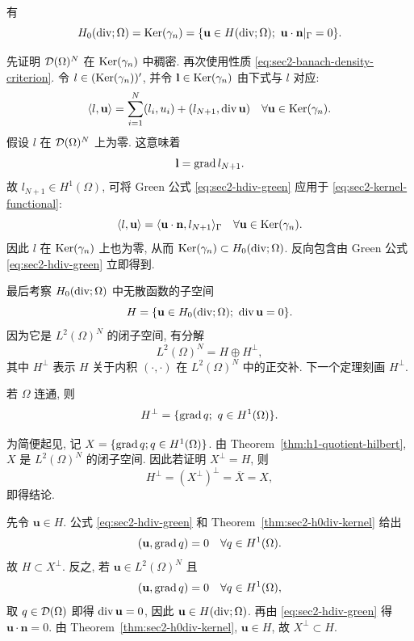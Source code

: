 \setcounter{statement}{5}
\begin{Theorem}\label{thm:sec2-h0div-kernel}
有
\[
  H_0(\operatorname{div};\Omega)=\operatorname{Ker}(\gamma_n)
  =\{\mathbf u\in H(\operatorname{div};\Omega);\ \mathbf u\cdot\mathbf n|_\Gamma=0\}.
\]
\end{Theorem}
\begin{Proof}
先证明 $\mathcal{D}(\Omega)^N$ 在 $\operatorname{Ker}(\gamma_n)$ 中稠密. 再次使用性质
\eqref{eq:sec2-banach-density-criterion}. 令 $l\in(\operatorname{Ker}(\gamma_n))'$, 并令
$\mathbf l\in\operatorname{Ker}(\gamma_n)$ 由下式与 $l$ 对应:
\begin{equation}\label{eq:sec2-kernel-functional}
  \langle l,\mathbf u\rangle
  =\sum_{i=1}^{N}(l_i,u_i)+(l_{N+1},\operatorname{div}\mathbf u)
  \quad\forall\mathbf u\in\operatorname{Ker}(\gamma_n).
\end{equation}
假设 $l$ 在 $\mathcal{D}(\Omega)^N$ 上为零. 这意味着
\[
  \mathbf l=\operatorname{grad} l_{N+1}.
\]
故 $l_{N+1}\in H^1(\Omega)$, 可将 Green 公式 \eqref{eq:sec2-hdiv-green}
应用于 \eqref{eq:sec2-kernel-functional}:
\[
  \langle l,\mathbf u\rangle
  =\langle\mathbf u\cdot\mathbf n,l_{N+1}\rangle_\Gamma
  \quad\forall\mathbf u\in\operatorname{Ker}(\gamma_n).
\]
因此 $l$ 在 $\operatorname{Ker}(\gamma_n)$ 上也为零, 从而
$\operatorname{Ker}(\gamma_n)\subset H_0(\operatorname{div};\Omega)$. 反向包含由 Green 公式
\eqref{eq:sec2-hdiv-green} 立即得到.
\end{Proof}

最后考察 $H_0(\operatorname{div};\Omega)$ 中无散函数的子空间
\[
  H=\{\mathbf u\in H_0(\operatorname{div};\Omega);\ \operatorname{div}\mathbf u=0\}.
\]
因为它是 $L^2(\Omega)^N$ 的闭子空间, 有分解
\[
  L^2(\Omega)^N=H\oplus H^\perp,
\]
其中 $H^\perp$ 表示 $H$ 关于内积 $(\cdot,\cdot)$ 在 $L^2(\Omega)^N$ 中的正交补.
下一个定理刻画 $H^\perp$.

\setcounter{statement}{6}
\begin{Theorem}\label{thm:sec2-hperp-gradients}
若 $\Omega$ 连通, 则
\[
  H^\perp=\{\operatorname{grad} q;\ q\in H^1(\Omega)\}.
\]
\end{Theorem}
\begin{Proof}
为简便起见, 记 $X=\{\operatorname{grad} q;q\in H^1(\Omega)\}$. 由
Theorem~\ref{thm:h1-quotient-hilbert},
$X$ 是 $L^2(\Omega)^N$ 的闭子空间. 因此若证明 $X^\perp=H$, 则
\[
  H^\perp=(X^\perp)^\perp=\overline X=X,
\]
即得结论.

先令 $\mathbf u\in H$. 公式 \eqref{eq:sec2-hdiv-green} 和
Theorem~\ref{thm:sec2-h0div-kernel} 给出
\[
  (\mathbf u,\operatorname{grad} q)=0\quad\forall q\in H^1(\Omega).
\]
故 $H\subset X^\perp$. 反之, 若 $\mathbf u\in L^2(\Omega)^N$ 且
\[
  (\mathbf u,\operatorname{grad} q)=0\quad\forall q\in H^1(\Omega),
\]
取 $q\in\mathcal{D}(\Omega)$ 即得 $\operatorname{div}\mathbf u=0$, 因此
$\mathbf u\in H(\operatorname{div};\Omega)$. 再由 \eqref{eq:sec2-hdiv-green} 得
$\mathbf u\cdot\mathbf n=0$. 由 Theorem~\ref{thm:sec2-h0div-kernel},
$\mathbf u\in H$, 故 $X^\perp\subset H$.
\end{Proof}

